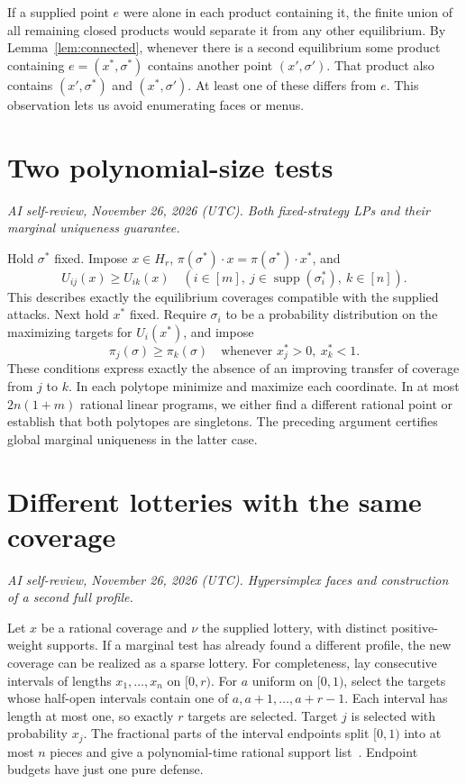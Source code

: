 \documentclass[11pt,oneside,openany,notitlepage]{report}
\newcommand{\reviewdate}{November 26, 2026 (UTC)}
\newcommand{\reviewmark}[1]{\par\nopagebreak[4]\noindent
  {\footnotesize\itshape AI self-review, \reviewdate. #1\par}\nobreak\smallskip}
\DeclareMathOperator{\supp}{supp}
\begin{document}
If a supplied point \(e\) were alone in each product containing it, the
finite union of all remaining closed products would separate it from any
other equilibrium. By Lemma~\ref{lem:connected}, whenever there is a
second equilibrium some product containing \(e=(x^*,\sigma^*)\) contains
another point \((x',\sigma')\). That product also contains
\((x',\sigma^*)\) and \((x^*,\sigma')\). At least one of these differs
from \(e\). This observation lets us avoid enumerating faces or menus.

\section{Two polynomial-size tests}
\reviewmark{Both fixed-strategy LPs and their marginal uniqueness guarantee.}

Hold \(\sigma^*\) fixed. Impose \(x\in H_r\),
\(\pi(\sigma^*)\cdot x=\pi(\sigma^*)\cdot x^*\), and
\[
  U_{ij}(x)\ge U_{ik}(x)\quad
  (i\in[m],\ j\in\supp(\sigma_i^*),\ k\in[n]).
\]
This describes exactly the equilibrium coverages compatible with the
supplied attacks. Next hold \(x^*\) fixed. Require \(\sigma_i\) to be a
probability distribution on the maximizing targets for \(U_i(x^*)\), and
impose
\[
       \pi_j(\sigma)\ge\pi_k(\sigma)
       \quad\text{whenever }x^*_j>0,\ x^*_k<1 .
\]
These conditions express exactly the absence of an improving transfer of
coverage from \(j\) to \(k\). In each polytope minimize and maximize each
coordinate. In at most \(2n(1+m)\) rational linear programs, we either
find a different rational point or establish that both polytopes are
singletons. The preceding argument certifies global marginal uniqueness
in the latter case.

\section{Different lotteries with the same coverage}
\reviewmark{Hypersimplex faces and construction of a second full profile.}

Let \(x\) be a rational coverage and \(\nu\) the supplied lottery, with
distinct positive-weight supports. If a marginal test has already found a
different profile, the new coverage can be realized as a sparse lottery.
For completeness, lay consecutive intervals of lengths \(x_1,\ldots,x_n\)
on \([0,r)\). For \(a\) uniform on \([0,1)\), select the targets whose
half-open intervals contain one of \(a,a+1,\ldots,a+r-1\). Each interval
has length at most one, so exactly \(r\) targets are selected. Target \(j\)
is selected with probability \(x_j\). The fractional parts of the interval
endpoints split \([0,1)\) into at most \(n\) pieces and give a polynomial-time
rational support list~\cite[Lemma~2.2]{book}. Endpoint budgets have just
one pure defense.
\end{document}
